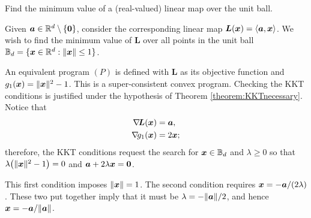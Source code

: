 \begin{example}
Find the minimum value of a (real-valued) linear map over the unit ball.

Given $\boldsymbol{a} \in \mathbb{R}^d\setminus\{ \boldsymbol{0}\}$, consider the corresponding linear map $\boldsymbol{L}(\boldsymbol{x}) = \langle \boldsymbol{a}, \boldsymbol{x} \rangle$.  We wish to find the minimum value of $\boldsymbol{L}$ over all points in the unit ball $\mathbb{B}_d = \{ \boldsymbol{x} \in \mathbb{R}^d : \lVert \boldsymbol{x} \rVert \leq 1 \}$.

An equivalent program $(P)$ is defined with $\boldsymbol{L}$ as its objective function and $g_1(\boldsymbol{x}) = \lVert \boldsymbol{x} \rVert^2-1$. This is a super-consistent convex program.  Checking the KKT conditions is justified under the hypothesis of Theorem \ref{theorem:KKTnecessary}. Notice that
\begin{align*}
\mathop{\nabla\! {\boldsymbol{L}}}(\boldsymbol{x}) &= \boldsymbol{a}, \\
\mathop{\nabla\! {g_1}}(\boldsymbol{x}) &= 2\boldsymbol{x};
\end{align*}
therefore, the KKT conditions request the search for $\boldsymbol{x} \in \mathbb{B}_d$ and $\lambda \geq 0$ so that $\lambda \big( \lVert \boldsymbol{x} \rVert^2-1 \big)=0$ and $\boldsymbol{a}+2\lambda\boldsymbol{x}=\boldsymbol{0}$.

This first condition imposes $\lVert \boldsymbol{x} \rVert=1$.  The second condition requires $\boldsymbol{x} = -\boldsymbol{a}/(2\lambda)$.  These two put together imply that it must be $\lambda = -\lVert \boldsymbol{a} \rVert/2$, and hence $\boldsymbol{x} = -\boldsymbol{a}/\lVert \boldsymbol{a} \rVert$.
\end{example}
